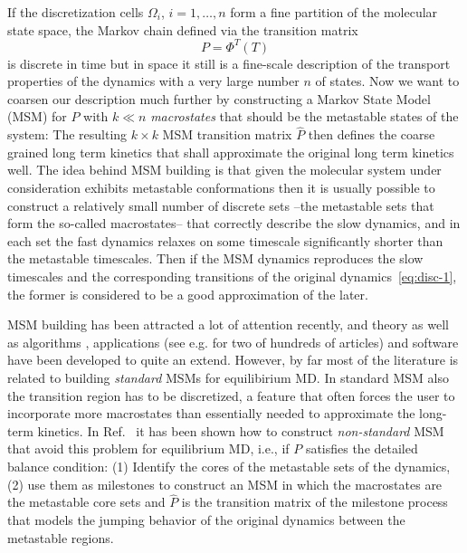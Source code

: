 \documentclass[aps, pre, preprint,unsortedaddress,a4paper,onecolumn]{revtex4}
\newcommand{\vect}[1]{#1}
\newcommand{\myphi}{\Phi}
\begin{document}
If the discretization cells $\Omega_i$, $i=1,\ldots,n$ form a fine
partition of the molecular state space, the Markov chain defined via
the transition matrix 
\begin{equation}\label{P}
\vect P=\myphi^T(T)
\end{equation}
 is discrete in time but in space it still is a fine-scale description of the transport properties of the
dynamics with a very large number $n$ of states.  Now we want to coarsen our description much further by
constructing a Markov State Model (MSM) for $\vect P$ with $k\ll n$
\emph{macrostates} that should be the metastable states of the system: The resulting $k\times k$ MSM transition matrix $\hat{\vect P}$
then defines the coarse grained long term kinetics that shall
approximate the original long term kinetics well. 
The idea behind MSM building is that given the molecular system under consideration exhibits metastable conformations then it is usually possible to construct a
relatively small number of discrete sets --the metastable sets that form the so-called macrostates-- that
correctly describe the slow  dynamics, and 
in each set the fast dynamics relaxes on some timescale significantly shorter than the metastable timescales.
Then if the MSM dynamics reproduces the slow timescales and the corresponding transitions
of the original dynamics~\eqref{eq:disc-1},
the former is considered to be a good approximation of the later.

MSM building has been attracted a lot of attention recently, and theory  \cite{A19-31} as well as algorithms \cite{A19-1}, applications (see e.g. \cite{A19-26,PNAS09} for two of hundreds of articles) and software \cite{A19-49, MSMBuilder} have been developed to quite an extend. However, 
by far most of the literature is related to building \emph{standard} MSMs for equilibirium MD. In standard MSM also the transition region has to be discretized, a feature that often forces the user to incorporate more macrostates than essentially needed to approximate the long-term kinetics.
In Ref.~\cite{sarich2010approximation, A19-31,schuette2011markov,BucheteHummer} it has been shown how to construct \emph{non-standard} MSM that avoid this problem for equilibrium MD, i.e., if $\vect P$ satisfies the detailed balance
condition: (1) Identify the cores of the metastable sets of the
dynamics, (2) use them as milestones to construct an MSM in which the
macrostates are the metastable core sets and $\hat{\vect P}$ is the transition
matrix of the milestone process \cite{A19-31,schuette2011markov,A19-29} that models the jumping behavior of
the original dynamics between the metastable regions. 
\end{document}
